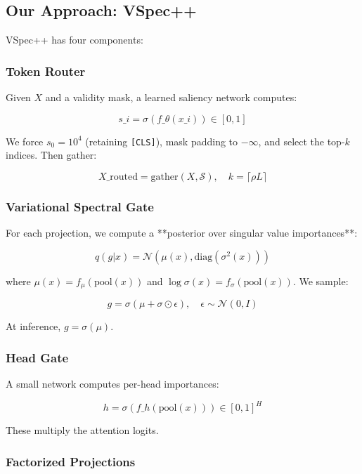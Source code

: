 \subsection{Our Approach: VSpec++}

VSpec++ has four components:

\subsubsection{Token Router}

Given $X$ and a validity mask, a learned saliency network computes:

\[
s\_i = \sigma(f\_\theta(x\_i)) \in [0, 1]
\tag{1.1}
\]

We force $s_0 = 10^4$ (retaining \texttt{[CLS]}), mask padding to $-\infty$, and 
select the top-$k$ indices. Then gather:

\[
X\_\text{routed} = \text{gather}(X, \mathcal{S}), \quad k = \lceil \rho L \rceil
\tag{1.2}
\]

\subsubsection{Variational Spectral Gate}

For each projection, we compute a **posterior over singular value 
importances**:

\[
q(g | x) = \mathcal{N}\!\left(\mu(x), \text{diag}(\sigma^2(x))\right)
\tag{1.3}
\]

where $\mu(x) = f_\mu(\text{pool}(x))$ and $\log \sigma(x) = f_\sigma(\text{pool}(x))$. 
We sample:

\[
g = \sigma(\mu + \sigma \odot \epsilon), \quad \epsilon \sim \mathcal{N}(0, I)
\tag{1.4}
\]

At inference, $g = \sigma(\mu)$.

\subsubsection{Head Gate}

A small network computes per-head importances:

\[
h = \sigma(f\_h(\text{pool}(x))) \in [0, 1]^H
\tag{1.5}
\]

These multiply the attention logits.

\subsubsection{Factorized Projections}

